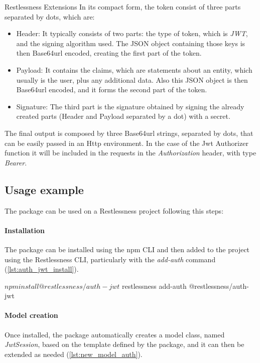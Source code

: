 \begin{chapter}{Restlessness Extensions}
    \noindent
    In its compact form, the token consist of three parts separated by dots,
    which are:
    \begin{itemize}
        \item Header: It typically consists of two parts: the type of token, which
            is \textit{JWT}, and the signing algorithm used. The JSON object
            containing those keys is then Base64url encoded, creating the first
            part of the token.
        \item Payload: It contains the claims, which are statements about an entity,
            which usually is the user, plus any additional data. Also this JSON
            object is then Base64url encoded, and it forms the second part of the token.
        \item Signature: The third part is the signature obtained by signing the
            already created parts (Header and Payload separated by a dot) with a
            secret.
    \end{itemize}
    The final output is composed by three Base64url strings, separated by dots,
    that can be easily passed in an Http environment. In the case of the Jwt
    Authorizer function it will be included in the requests in the
    \textit{Authorization} header, with type \textit{Bearer}.

    \subsection{Usage example}
    The package can be used on a Restlessness project following this steps:

    \paragraph{Installation}
    The package can be installed using the npm CLI and then added to the project
    using the Restlessness CLI, particularly with the \textit{add-auth} command
    (\ref{lst:auth_jwt_install}).

    \bigskip
    \begin{code}[caption=auth-jwt installation, label={lst:auth_jwt_install},  language=shell]
$ npm install @restlessness/auth-jwt
$ restlessness add-auth @restlessness/auth-jwt
    \end{code}

    \paragraph{Model creation}
    Once installed, the package automatically creates a model class, named
    \textit{JwtSession}, based on the template defined by the package, and it can
    then be extended as needed (\ref{lst:new_model_auth}).


\end{chapter}

